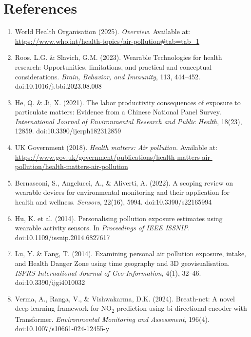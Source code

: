 \documentclass[12pt,a4paper]{report}
\begin{document}
\chapter*{References}
\begin{enumerate}

\item World Health Organisation (2025). \emph{Overview}. Available at: \url{https://www.who.int/health-topics/air-pollution#tab=tab_1}

\item Roos, L.G. \& Slavich, G.M. (2023). Wearable Technologies for health research: Opportunities, limitations, and practical and conceptual considerations. \emph{Brain, Behavior, and Immunity}, 113, 444--452. doi:10.1016/j.bbi.2023.08.008

\item He, Q. \& Ji, X. (2021). The labor productivity consequences of exposure to particulate matters: Evidence from a Chinese National Panel Survey. \emph{International Journal of Environmental Research and Public Health}, 18(23), 12859. doi:10.3390/ijerph182312859

\item UK Government (2018). \emph{Health matters: Air pollution}. Available at: \url{https://www.gov.uk/government/publications/health-matters-air-pollution/health-matters-air-pollution}

\item Bernasconi, S., Angelucci, A., \& Aliverti, A. (2022). A scoping review on wearable devices for environmental monitoring and their application for health and wellness. \emph{Sensors}, 22(16), 5994. doi:10.3390/s22165994

\item Hu, K. et al. (2014). Personalising pollution exposure estimates using wearable activity sensors. In \emph{Proceedings of IEEE ISSNIP}. doi:10.1109/issnip.2014.6827617

\item Lu, Y. \& Fang, T. (2014). Examining personal air pollution exposure, intake, and Health Danger Zone using time geography and 3D geovisualisation. \emph{ISPRS International Journal of Geo-Information}, 4(1), 32--46. doi:10.3390/ijgi4010032

\item Verma, A., Ranga, V., \& Vishwakarma, D.K. (2024). Breath-net: A novel deep learning framework for NO\textsubscript{2} prediction using bi-directional encoder with Transformer. \emph{Environmental Monitoring and Assessment}, 196(4). doi:10.1007/s10661-024-12455-y


\end{enumerate}
\end{document}
